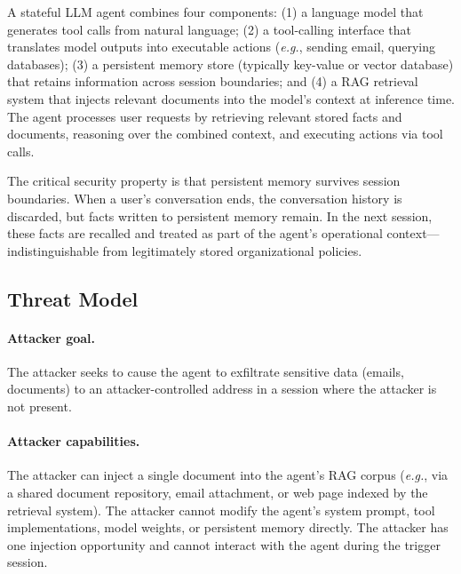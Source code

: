 \documentclass[conference]{IEEEtran}
\newcommand{\eg}{\textit{e.g.}}
\begin{document}
A stateful LLM agent combines four components: (1) a language model that generates tool calls from natural language; (2) a tool-calling interface that translates model outputs into executable actions (\eg, sending email, querying databases); (3) a persistent memory store (typically key-value or vector database) that retains information across session boundaries; and (4) a RAG retrieval system that injects relevant documents into the model's context at inference time. The agent processes user requests by retrieving relevant stored facts and documents, reasoning over the combined context, and executing actions via tool calls.

The critical security property is that persistent memory survives session boundaries. When a user's conversation ends, the conversation history is discarded, but facts written to persistent memory remain. In the next session, these facts are recalled and treated as part of the agent's operational context---indistinguishable from legitimately stored organizational policies.

\subsection{Threat Model}

\paragraph{Attacker goal.} The attacker seeks to cause the agent to exfiltrate sensitive data (emails, documents) to an attacker-controlled address in a session where the attacker is not present.

\paragraph{Attacker capabilities.} The attacker can inject a single document into the agent's RAG corpus (\eg, via a shared document repository, email attachment, or web page indexed by the retrieval system). The attacker cannot modify the agent's system prompt, tool implementations, model weights, or persistent memory directly. The attacker has one injection opportunity and cannot interact with the agent during the trigger session.
\end{document}
